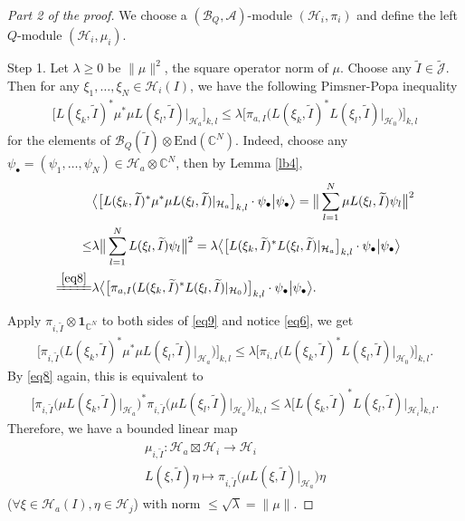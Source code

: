 \documentclass[12pt,a4paper,notitlepage]{article}
\theoremstyle{definition}
\theoremstyle{plain}
\newcommand{\mc}{\mathcal}
\newcommand{\wtd}{\widetilde}
\newcommand{\End}{\mathrm{End}} %
\newcommand{\id}{\mathbf{1}}
\newcommand{\Jtd}{\widetilde{\mathcal J}}
\newcommand{\blt}{\bullet}
\newcommand{\Cbb}{\mathbb C}
\numberwithin{equation}{section}
\begin{document}
\begin{proof}[Part 2 of the proof]
We choose a $(\mc B_Q,\mc A)$-module $(\mc H_i,\pi_i)$ and define the left $Q$-module $(\mc H_i,\mu_i)$.

Step 1. Let $\lambda\geq 0$ be $\lVert\mu\lVert^2$, the square operator norm of $\mu$. Choose any $\wtd I\in\Jtd$. Then for any $\xi_1,\dots,\xi_N\in\mc H_i(I)$, we have the following Pimsner-Popa inequality
\begin{align}
\Big[L(\xi_k,\wtd I)^*\mu^*\mu L(\xi_l,\wtd I)\big|_{\mc H_a}\Big]_{k,l}\leq \lambda \Big[\pi_{a,I}\big(L(\xi_k,\wtd I)^*L(\xi_l,\wtd I)\big|_{\mc H_0}\big)\Big]_{k,l}	\label{eq9}
\end{align}
for the elements of $\mc B_Q(\wtd I)\otimes \End(\Cbb^N)$. Indeed, choose any $\psi_\blt=(\psi_1,\dots,\psi_N)\in\mc H_a\otimes\Cbb^N$, then by Lemma \ref{lb4},
\begin{align*}
&\big\langle \big[L(\xi_k,\wtd I)^*\mu^*\mu L(\xi_l,\wtd I)|_{\mc H_a}\big]_{k,l}\cdot \psi_\blt\big|\psi_\blt \big\rangle	=\big\lVert \sum_{l=1}^N \mu L(\xi_l,\wtd I)\psi_l \big\lVert^2\\
\leq&\lambda\big\lVert \sum_{l=1}^N L(\xi_l,\wtd I)\psi_l \big\lVert^2=\lambda\big\langle \big[L(\xi_k,\wtd I)^*L(\xi_l,\wtd I)|_{\mc H_a}\big]_{k,l}\cdot \psi_\blt\big|\psi_\blt \big\rangle\\
\xlongequal{\eqref{eq8}}&\lambda\big\langle \big[\pi_{a,I}(L(\xi_k,\wtd I)^*L(\xi_l,\wtd I)|_{\mc H_0})\big]_{k,l}\cdot \psi_\blt\big|\psi_\blt \big\rangle.
\end{align*}


Apply $\pi_{i,\wtd I}\otimes\id_{\Cbb^N}$ to both sides of \eqref{eq9} and notice \eqref{eq6}, we get
\begin{align*}
\Big[\pi_{i,\wtd I}\big(L(\xi_k,\wtd I)^*\mu^*\mu L(\xi_l,\wtd I)\big|_{\mc H_a}\big)\Big]_{k,l}\leq \lambda \Big[\pi_{i,I}\big(L(\xi_k,\wtd I)^*L(\xi_l,\wtd I)\big|_{\mc H_0}\big)\Big]_{k,l}.
\end{align*}
By \eqref{eq8} again, this is equivalent to
\begin{align}
	\Big[\pi_{i,\wtd I}\big(\mu L(\xi_k,\wtd I)\big|_{\mc H_a}\big)^*\pi_{i,\wtd I}\big(\mu L(\xi_l,\wtd I)\big|_{\mc H_a}\big)\Big]_{k,l}\leq \lambda \Big[L(\xi_k,\wtd I)^*L(\xi_l,\wtd I)\big|_{\mc H_i}\Big]_{k,l}.
\end{align}
Therefore, we have a bounded linear map
\begin{gather}\label{eq10}
\begin{gathered}
\mu_{i,\wtd I}:\mc H_a\boxtimes\mc H_i\rightarrow\mc H_i\\
L(\xi,\wtd I)\eta\mapsto \pi_{i,\wtd I}\big(\mu L(\xi,\wtd I)\big|_{\mc H_a}\big)\eta
\end{gathered}	
\end{gather}
($\forall\xi\in\mc H_a(I),\eta\in\mc H_j$) with norm $\leq \sqrt{\lambda}=\lVert\mu\lVert$.


\end{proof}
\end{document}
